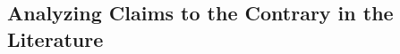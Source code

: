 \documentclass{article}
\newcommand{\rao}[1]{\noindent\textcolor{red}{#1}}
\theoremstyle{plain}
\theoremstyle{definition}
\theoremstyle{remark}
\begin{document}





\subsection{Analyzing Claims to the Contrary in the Literature}
\label{sec:contrary}
\end{document}

